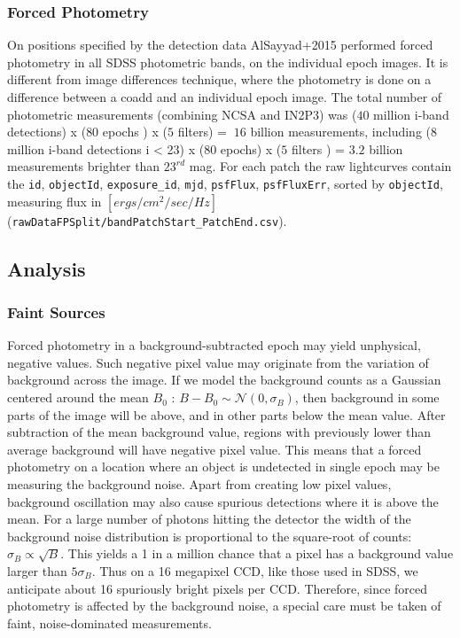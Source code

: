 \documentclass[fleqn,usenatbib]{mnras}  %
\begin{document}
\subsubsection{Forced Photometry}
On positions specified by the detection data AlSayyad+2015 performed forced photometry in all SDSS photometric bands, on the individual epoch images. It is different from image differences technique, where the photometry is done on a difference between a coadd and an individual epoch image.  The total number of photometric measurements (combining NCSA and IN2P3) was  ($40$  million i-band detections) x ($80$ epochs ) x ($5$ filters) = $~16$ billion measurements, including   ($8$ million i-band detections i < 23) x ($80$ epochs) x ($5$ filters ) = $3.2$ billion measurements brighter than $23^{rd}$ mag.
For each patch the raw lightcurves contain the \verb|id|, \verb|objectId|, \verb|exposure_id|, \verb|mjd|, \verb|psfFlux|, \verb|psfFluxErr|, sorted by \verb|objectId|, measuring flux in $[ergs/ cm^{2} / sec / Hz]$ (\verb|rawDataFPSplit/bandPatchStart_PatchEnd.csv|). 



\subsection{Analysis}

\subsubsection{Faint Sources}
\label{sec:faint_sources}

%
%
Forced photometry in a background-subtracted epoch may yield unphysical, negative values. Such negative pixel value may originate from the variation of background across the image. If we model the background counts  as a Gaussian centered around the mean  $B_{0}$ :   $B-B_{0}  \sim  \mathcal{N}(0,\sigma_{B})$, then background in some parts of the image will be above, and in other parts below the mean value. After subtraction of the mean background value, regions with previously lower than average background will have negative pixel value.  This means that a forced photometry on a location where an object is undetected in single epoch may be measuring the background noise. Apart from creating low pixel values, background oscillation may also cause spurious detections where it is above the mean. For a large number of photons hitting the detector the width of the background noise distribution is  proportional to the square-root of counts: $\sigma_{B} \propto \sqrt {B}$. This yields a 1 in a million chance that a pixel has a background value larger than $5\sigma_{B}$.   Thus on a 16 megapixel CCD, like those used in SDSS, we anticipate  about  16 spuriously bright pixels  per CCD.  Therefore,  since forced photometry is affected by  the background noise, a special care must be taken of faint, noise-dominated measurements. 
\end{document}
